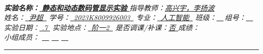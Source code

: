 \documentclass[UTF8]{article}
\theoremstyle{MyLineTheoremStyle} %
\theoremstyle{MyBlockTheoremStyle} %
\theoremstyle{MySubsubsectionStyle} %
\begin{document}


\begin{center}\large
    \\\vspace{0.4cm}
    \noindent\textit{
        \textbf{\bfseries 实验名称：}\uline{\hspace{0.8cm} \bfseries 静态和动态数码管显示实验 \hspace{0.8cm}}\hspace{0.4cm} 
        指导教师：\uline{\hspace{0.5cm}高兴宇，李扬波\hspace{0.5cm}}}
    \\\vspace{0.1cm}
    \noindent\textit{
        姓名：\uline{\,\,\,尹超\,\,\,}\hspace{0.2cm}
        学号：\uline{\,\,\,{\upshape 2023K8009926003}\,\,\,}\hspace{0.2cm}
        专业：\uline{\,\,\,人工智能\,\,\,}\hspace{0.2cm}
        班级：\uline{\,\,\,\,\,\,}\,组号：\uline{\,\,\,\,\,\,}}
    \\\vspace{0.1cm}
    \noindent\textit{
        实验日期：\uline{\,\,{.7}\,\,}\hspace{0.2cm}
        实验地点：\uline{\,\,\,{\upshape 阶一2}\,\,\,}\hspace{0.2cm}
        是否调课/补课：\uline{\hspace{0.26cm}否 \hspace{0.26cm}}\hspace{0.2cm}
        成绩：\uline{\hspace{2cm}}}
    \\\vspace{0.1cm}
    \noindent\textit{
        小组成员：
        \uline{\,\,\,\,\,\,}\hspace{0.2cm}
        \uline{\,\,\,\,\,\,}\hspace{0.2cm}
        \uline{\,\,\,\,\,\,}\hspace{0.2cm}
    }
\end{center}
\noindent\rule{\textwidth}{0.1em}   %
\end{document}
